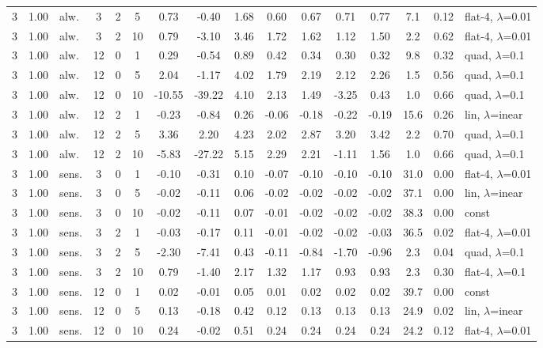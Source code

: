 \begin{scriptsize}
\begin{longtable}{cclcc c ccc ccc c cc l}
3 & 1.00 & alw. & 3 & 2 & 5 & 0.73 & -0.40 & 1.68 & 0.60 & 0.67 & 0.71 & 0.77 & 7.1 & 0.12 & flat-4, $\lambda$=0.01 \\
3 & 1.00 & alw. & 3 & 2 & 10 & 0.79 & -3.10 & 3.46 & 1.72 & 1.62 & 1.12 & 1.50 & 2.2 & 0.62 & flat-4, $\lambda$=0.01 \\
3 & 1.00 & alw. & 12 & 0 & 1 & 0.29 & -0.54 & 0.89 & 0.42 & 0.34 & 0.30 & 0.32 & 9.8 & 0.32 & quad, $\lambda$=0.1 \\
3 & 1.00 & alw. & 12 & 0 & 5 & 2.04 & -1.17 & 4.02 & 1.79 & 2.19 & 2.12 & 2.26 & 1.5 & 0.56 & quad, $\lambda$=0.1 \\
3 & 1.00 & alw. & 12 & 0 & 10 & -10.55 & -39.22 & 4.10 & 2.13 & 1.49 & -3.25 & 0.43 & 1.0 & 0.66 & quad, $\lambda$=0.1 \\
3 & 1.00 & alw. & 12 & 2 & 1 & -0.23 & -0.84 & 0.26 & -0.06 & -0.18 & -0.22 & -0.19 & 15.6 & 0.26 & lin, $\lambda$=inear \\
3 & 1.00 & alw. & 12 & 2 & 5 & 3.36 & 2.20 & 4.23 & 2.02 & 2.87 & 3.20 & 3.42 & 2.2 & 0.70 & quad, $\lambda$=0.1 \\
3 & 1.00 & alw. & 12 & 2 & 10 & -5.83 & -27.22 & 5.15 & 2.29 & 2.21 & -1.11 & 1.56 & 1.0 & 0.66 & quad, $\lambda$=0.1 \\
3 & 1.00 & sens. & 3 & 0 & 1 & -0.10 & -0.31 & 0.10 & -0.07 & -0.10 & -0.10 & -0.10 & 31.0 & 0.00 & flat-4, $\lambda$=0.01 \\
3 & 1.00 & sens. & 3 & 0 & 5 & -0.02 & -0.11 & 0.06 & -0.02 & -0.02 & -0.02 & -0.02 & 37.1 & 0.00 & lin, $\lambda$=inear \\
3 & 1.00 & sens. & 3 & 0 & 10 & -0.02 & -0.11 & 0.07 & -0.01 & -0.02 & -0.02 & -0.02 & 38.3 & 0.00 & const \\
3 & 1.00 & sens. & 3 & 2 & 1 & -0.03 & -0.17 & 0.11 & -0.01 & -0.02 & -0.02 & -0.03 & 36.5 & 0.02 & flat-4, $\lambda$=0.01 \\
3 & 1.00 & sens. & 3 & 2 & 5 & -2.30 & -7.41 & 0.43 & -0.11 & -0.84 & -1.70 & -0.96 & 2.3 & 0.04 & quad, $\lambda$=0.1 \\
3 & 1.00 & sens. & 3 & 2 & 10 & 0.79 & -1.40 & 2.17 & 1.32 & 1.17 & 0.93 & 0.93 & 2.3 & 0.30 & flat-4, $\lambda$=0.1 \\
3 & 1.00 & sens. & 12 & 0 & 1 & 0.02 & -0.01 & 0.05 & 0.01 & 0.02 & 0.02 & 0.02 & 39.7 & 0.00 & const \\
3 & 1.00 & sens. & 12 & 0 & 5 & 0.13 & -0.18 & 0.42 & 0.12 & 0.13 & 0.13 & 0.13 & 24.9 & 0.02 & lin, $\lambda$=inear \\
3 & 1.00 & sens. & 12 & 0 & 10 & 0.24 & -0.02 & 0.51 & 0.24 & 0.24 & 0.24 & 0.24 & 24.2 & 0.12 & flat-4, $\lambda$=0.01 \\

\end{longtable}
\end{scriptsize}
